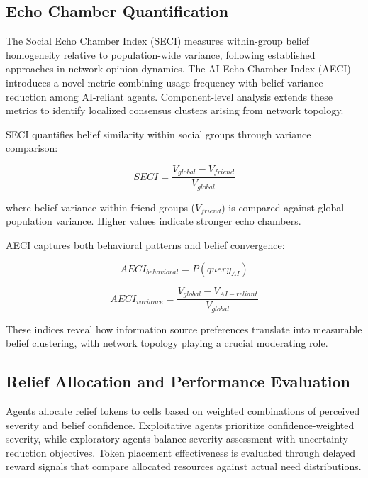\documentclass[pdflatex,sn-apa]{sn-jnl}%
\begin{document}
\subsection{Echo Chamber Quantification}

The Social Echo Chamber Index (SECI) measures within-group belief homogeneity relative to population-wide variance, following established approaches in network opinion dynamics. The AI Echo Chamber Index (AECI) introduces a novel metric combining usage frequency with belief variance reduction among AI-reliant agents. Component-level analysis extends these metrics to identify localized consensus clusters arising from network topology.

SECI quantifies belief similarity within social groups through variance comparison:

\begin{equation}
SECI = \frac{V_{global} - V_{friend}}{V_{global}}
\end{equation}

where belief variance within friend groups ($V_{friend}$) is compared against global population variance. Higher values indicate stronger echo chambers.

AECI captures both behavioral patterns and belief convergence:

\begin{equation}
AECI_{behavioral} = P(query_{AI})
\end{equation}

\begin{equation}
AECI_{variance} = \frac{V_{global} - V_{AI-reliant}}{V_{global}}
\end{equation}

These indices reveal how information source preferences translate into measurable belief clustering, with network topology playing a crucial moderating role.

\subsection{Relief Allocation and Performance Evaluation}

Agents allocate relief tokens to cells based on weighted combinations of perceived severity and belief confidence. Exploitative agents prioritize confidence-weighted severity, while exploratory agents balance severity assessment with uncertainty reduction objectives. Token placement effectiveness is evaluated through delayed reward signals that compare allocated resources against actual need distributions.
\end{document}
